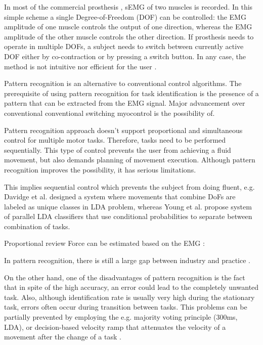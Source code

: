 In most of the commercial prosthesis \citep{Parker1986}, sEMG of two muscles is recorded. In this simple scheme a single Degree-of-Freedom (DOF) can be controlled: the EMG amplitude of one muscle controls the output of one direction, whereas the EMG amplitude of the other muscle controls the other direction. If prosthesis needs to operate in multiple DOFs, a subject needs to switch between currently active DOF either by co-contraction or by pressing a switch button. In any case, the method is not intuitive nor efficient for the user \citep{Farina2014}.

Pattern recognition is an alternative to conventional control algorithms. The prerequisite of using pattern recognition for task identification is the presence of a pattern that can be extracted from the EMG signal. Major advancement over conventional conventional switching myocontrol is the possibility of.

Pattern recognition approach doesn't support proportional and simultaneous control for multiple motor tasks. Therefore, tasks need to be performed sequentially. This type of control prevents the user from achieving a fluid movement, but also demands planning of movement execution. Although pattern recognition improves the possibility, it has serious limitations. 

This implies sequential control which prevents the subject from doing fluent, e.g. Davidge et al. designed a system where movements that combine DoFs are labeled as unique classes in LDA problem, whereas Young et al. \citep{Young2013} propose system of parallel LDA classifiers that use conditional probabilities to separate between combination of tasks.

Proportional review \citep{Fougner2012}
Force can be estimated based on the EMG : \citep{Staudenmann2010}

In pattern recognition, there is still a large gap between industry and practice \citep{Jiang2012}.

On the other hand, one of the disadvantages of pattern recognition is the fact that in spite of the high accuracy, an error could lead to the completely unwanted task. Also, although identification rate is usually very high during the stationary task, errors often occur during transition between tasks. This problems can be partially prevented by employing the e.g. majority voting principle \citep{Englehart2003} (300ms, LDA), or decision-based velocity ramp that attenuates the velocity of a movement after the change of a task \citep{Simon2011}. 

